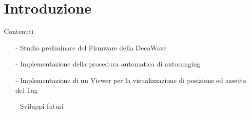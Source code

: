 \section{Introduzione}
\begin{frame}{Contenuti}
  \begin{itemize}
  \item [-] Studio preliminare del Firmware della DecaWave
  \item [-] Implementazione della procedura \alert{automatica} di autoranging
  \item [-] Implementazione di un Viewer per la visualizzazione di posizione ed assetto del Tag
  \item [-] Sviluppi futuri
  \end{itemize}
\end{frame}
